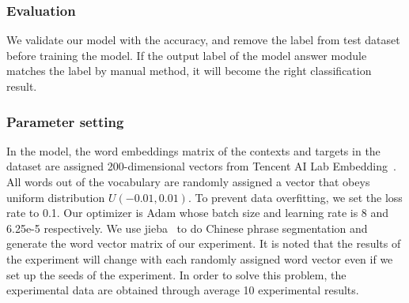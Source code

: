 \documentclass{ieeeaccess}
\begin{document}
\renewcommand{\multirowsetup}{\centering}
\begin{table}
	\caption{}
	\centering
	\label{stat-dataset}
\end{table}

\subsubsection{Evaluation}
We validate our model with the accuracy, and remove the label from test dataset before training the model. If the output label of the model answer module matches the label by manual method, it will become the right classification result.

\subsubsection{Parameter setting}
In the model, the word embeddings matrix of the contexts and targets in the dataset are assigned 200-dimensional vectors from Tencent AI Lab Embedding~\cite{DBLP:conf/naacl/SongSLZ18}. All words out of the vocabulary are randomly assigned a vector that obeys uniform distribution $U\left(-0.01, 0.01\right)$. To prevent data overfitting, we set the loss rate to 0.1. Our optimizer is Adam whose batch size and learning rate is 8 and 6.25e-5 respectively. We use jieba~\cite{sun2012jieba} to do Chinese phrase segmentation and generate the word vector matrix of our experiment. It is noted that the results of the experiment will change with each randomly assigned word vector even if we set up the seeds of the experiment. In order to solve this problem, the experimental data are obtained through average 10 experimental results.
\end{document}
